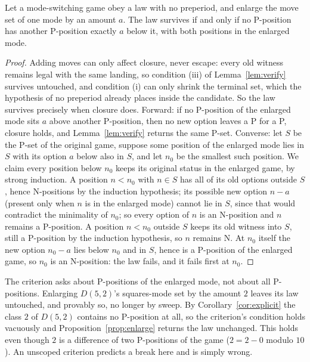 \begin{proposition}\label{prop:enlarge}
Let a mode-switching game obey a law with no preperiod,
and enlarge the move set of one mode by an amount $a$. The law survives
if and only if no P-position has another P-position exactly $a$ below it,
with both positions in the enlarged mode.
\end{proposition}
\begin{proof}
Adding moves can only affect closure, never escape: every old witness
remains legal with the same landing, so condition (iii) of
Lemma~\ref{lem:verify} survives untouched, and condition (i) can only
shrink the terminal set, which the hypothesis of no preperiod already
places inside the candidate. So the law survives precisely when closure
does. Forward: if no P-position of the enlarged mode sits $a$ above
another P-position, then no new option leaves a P for a P, closure holds,
and Lemma~\ref{lem:verify} returns the same P-set. Converse: let $S$ be
the P-set of the original game, suppose some position of the enlarged
mode lies in $S$ with its option $a$ below also in $S$, and let $n_0$ be
the smallest such position. We claim every position below $n_0$ keeps its
original status in the enlarged game, by strong induction. A position
$n < n_0$ with $n \in S$ has all of its old options outside $S$, hence
N-positions by the induction hypothesis; its possible new option
$n - a$ (present only when $n$ is in the enlarged mode) cannot lie
in $S$, since that would contradict the minimality of $n_0$; so every
option of $n$ is an N-position and $n$ remains a P-position. A position
$n < n_0$ outside $S$ keeps its old witness into $S$, still a P-position
by the induction hypothesis, so $n$ remains N. At $n_0$ itself the new
option $n_0 - a$ lies below $n_0$ and in $S$, hence is a P-position of
the enlarged game, so $n_0$ is an N-position: the law fails, and it fails
first at $n_0$.
\end{proof}
\begin{remark}\label{rem:scoping}
The criterion asks about P-positions of the enlarged mode, not about all
P-positions. Enlarging $D(5, 2)$'s squares-mode set by the amount $2$
leaves its law untouched, and provably so, no longer by sweep. By
Corollary~\ref{cor:explicit} the class $2$ of $D(5, 2)$ contains no
P-position at all, so the criterion's condition holds vacuously and
Proposition~\ref{prop:enlarge} returns the law unchanged. This holds even though
$2$ is a difference of two P-positions of the game
($2 = 2 - 0$ modulo $10$). An unscoped criterion predicts a break here
and is simply wrong.
\end{remark}
